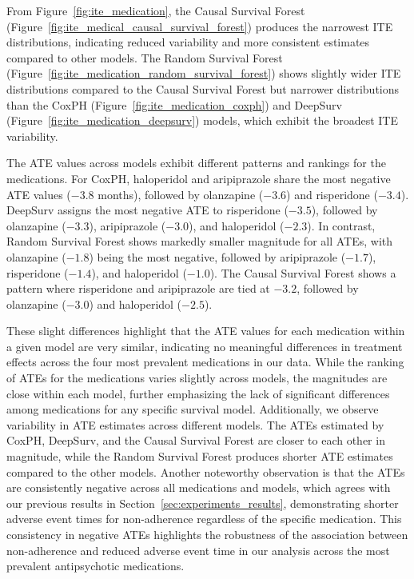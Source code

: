 From Figure~\ref{fig:ite_medication}, the Causal Survival Forest (Figure~\ref{fig:ite_medical_causal_survival_forest}) produces the narrowest ITE distributions, indicating reduced variability and more consistent estimates compared to other models. 
The Random Survival Forest (Figure~\ref{fig:ite_medication_random_survival_forest}) shows slightly wider ITE distributions compared to the Causal Survival Forest but narrower distributions than the CoxPH (Figure~\ref{fig:ite_medication_coxph}) and DeepSurv (Figure~\ref{fig:ite_medication_deepsurv}) models, which exhibit the broadest ITE variability.

The ATE values across models exhibit different patterns and rankings for the medications. 
For CoxPH, haloperidol and aripiprazole share the most negative ATE values (\(-3.8\) months), followed by olanzapine (\(-3.6\)) and risperidone (\(-3.4\)). 
DeepSurv assigns the most negative ATE to risperidone (\(-3.5\)), followed by olanzapine (\(-3.3\)), aripiprazole (\(-3.0\)), and haloperidol (\(-2.3\)). 
In contrast, Random Survival Forest shows markedly smaller magnitude for all ATEs, with olanzapine (\(-1.8\)) being the most negative, followed by aripiprazole (\(-1.7\)), risperidone (\(-1.4\)), and haloperidol (\(-1.0\)). 
The Causal Survival Forest shows a pattern where risperidone and aripiprazole are tied at \(-3.2\), followed by olanzapine (\(-3.0\)) and haloperidol (\(-2.5\)).

These slight differences highlight that the ATE values for each medication within a given model are very similar, indicating no meaningful differences in treatment effects across the four most prevalent medications in our data.
While the ranking of ATEs for the medications varies slightly across models, the magnitudes are close within each model, further emphasizing the lack of significant differences among medications for any specific survival model. 
Additionally, we observe variability in ATE estimates across different models. 
The ATEs estimated by CoxPH, DeepSurv, and the Causal Survival Forest are closer to each other in magnitude, while the Random Survival Forest produces shorter ATE estimates compared to the other models. 
Another noteworthy observation is that the ATEs are consistently negative across all medications and models, which agrees with our previous results in Section~\ref{sec:experiments_results}, demonstrating shorter adverse event times for non-adherence regardless of the specific medication. 
This consistency in negative ATEs highlights the robustness of the association between non-adherence and reduced adverse event time in our analysis across the most prevalent antipsychotic medications.

